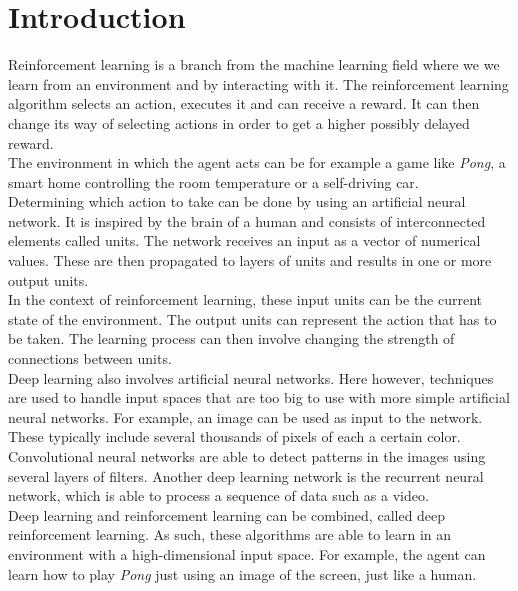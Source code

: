 \chapter{Introduction}

Reinforcement learning is a branch from the machine learning field where we we learn from an environment and by interacting with it.
The reinforcement learning algorithm selects an action, executes it and can receive a reward.
It can then change its way of selecting actions in order to get a higher possibly delayed reward.\\
The environment in which the agent acts can be for example a game like \textit{Pong}, a smart home controlling the room temperature or a self-driving car.\\

Determining which action to take can be done by using an artificial neural network.
It is inspired by the brain of a human and consists of interconnected elements called units.
The network receives an input as a vector of numerical values.
These are then propagated to layers of units and results in one or more output units.\\
In the context of reinforcement learning, these input units can be the current state of the environment.
The output units can represent the action that has to be taken.
The learning process can then involve changing the strength of connections between units.\\

Deep learning also involves artificial neural networks.
Here however, techniques are used to handle input spaces that are too big to use with more simple artificial neural networks.
For example, an image can be used as input to the network.
These typically include several thousands of pixels of each a certain color.
Convolutional neural networks are able to detect patterns in the images using several layers of filters.
Another deep learning network is the recurrent neural network, which is able to process a sequence of data such as a video.\\

Deep learning and reinforcement learning can be combined, called deep reinforcement learning.
As such, these algorithms are able to learn in an environment with a high-dimensional input space.
For example, the agent can learn how to play \textit{Pong} just using an image of the screen, just like a human.\\

